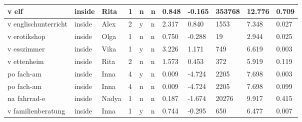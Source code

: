 \begin{longtable}{|p{4cm}|p{1cm}|p{1.2cm}|p{0.5cm}|p{0.5cm}|p{0.5cm}|R{1cm}|R{1cm}|R{1cm}|R{1cm}|R{1cm}|}
v elf                      & inside            & Rita          & 1                                   & n                          & n                          & 0.848      & -0.165        & 353768                  & 12.776                        & 0.709                   \\ \hline
v englischunterricht       & inside            & Alex          & 2                                   & y                          & n                          & 2.317      & 0.840         & 1553                    & 7.348                         & 0.027                   \\ \hline
v erotikshop               & inside            & Olga          & 1                                   & n                          & n                          & 0.750      & -0.288        & 19                      & 2.944                         & 0.025                   \\ \hline
v esszimmer                & inside            & Vika          & 1                                   & y                          & n                          & 3.226      & 1.171         & 749                     & 6.619                         & 0.003                   \\ \hline
v ettenheim                & inside            & Rita          & 2                                   & n                          & n                          & 1.573      & 0.453         & 372                     & 5.919                         & 0.119                   \\ \hline
po fach-am                 & inside            & Inna          & 4                                   & y                          & n                          & 0.009      & -4.724        & 2205                    & 7.698                         & 0.003                   \\ \hline
po fach-am                 & inside            & Inna          & 4                                   & n                          & n                          & 0.009      & -4.724        & 2205                    & 7.698                         & 0.099                   \\ \hline
na fahrrad-e               & inside            & Nadya         & 1                                   & n                          & n                          & 0.187      & -1.674        & 20276                   & 9.917                         & 0.415                   \\ \hline
v familienberatung         & inside            & Inna          & 1                                   & y                          & n                          & 0.744      & -0.295        & 650                     & 6.477                         & 0.007                   \\ \hline

\end{longtable}

